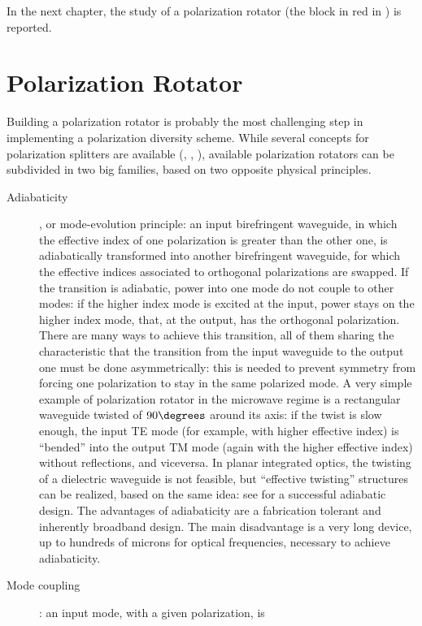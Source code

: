 In the next chapter, the study of a polarization rotator (the block in
red in ) is reported.

\section{Polarization Rotator} \label{sec:polrot}

Building a polarization rotator is probably the most challenging step
in implementing a polarization diversity scheme. While several concepts
for polarization splitters are available (\cite{kiyat_compact},
\cite{taillaert_compact}, \cite{wu_planar}), available polarization
rotators can be subdivided in two big families, based on two opposite
physical principles.
\begin{description}
\item[Adiabaticity], or mode-evolution principle: an input
  birefringent waveguide, in which the effective index of one
  polarization is greater than the other one, is adiabatically
  transformed into another birefringent waveguide, for which the
  effective indices associated to orthogonal polarizations are
  swapped. If the transition is adiabatic, power into one mode do not
  couple to other modes: if the higher index mode is excited at the
  input, power stays on the higher index mode, that, at the output,
  has the orthogonal polarization. There are many ways to achieve this
  transition, all of them sharing the characteristic that the
  transition from the input waveguide to the output one must be done
  asymmetrically: this is needed to prevent symmetry from forcing one
  polarization to stay in the same polarized mode. A very simple
  example of polarization rotator in the microwave regime is a
  rectangular waveguide twisted of $90\degrees$ around its axis: if
  the twist is slow enough, the input TE mode (for example, with
  higher effective index) is ``bended'' into the output TM mode (again
  with the higher effective index) without reflections, and
  viceversa. In planar integrated optics, the twisting of a dielectric
  waveguide is not feasible, but ``effective twisting'' structures can
  be realized, based on the same idea: see \cite{watts_integrated} for
  a successful adiabatic design. The advantages of adiabaticity are a
  fabrication tolerant and inherently broadband design. The main
  disadvantage is a very long device, up to hundreds of microns for
  optical frequencies, necessary to achieve adiabaticity.
\item[Mode coupling]: an input mode, with a given polarization, is

\end{description}
